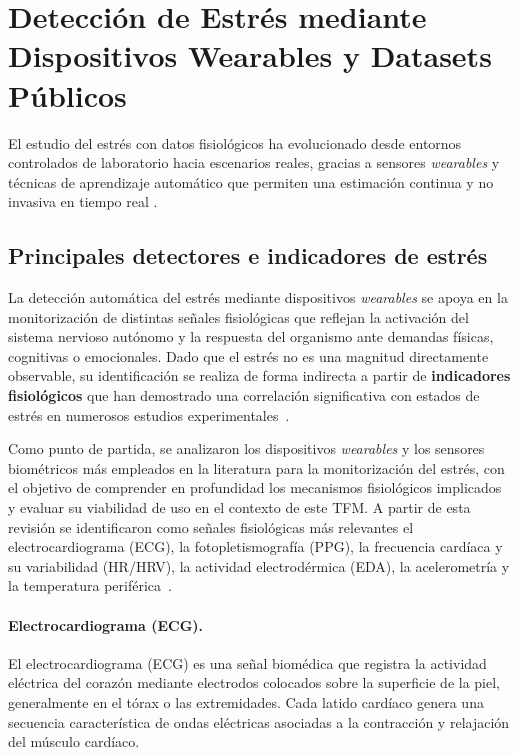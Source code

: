\documentclass{report}
\begin{document}
\section{Detección de Estrés mediante Dispositivos Wearables y Datasets Públicos}
\label{sec:datasets-stress}

El estudio del estrés con datos fisiológicos ha evolucionado desde entornos controlados de laboratorio hacia escenarios reales, gracias a sensores \textit{wearables} y técnicas de aprendizaje automático que permiten una estimación continua y no invasiva en tiempo real \cite{Pinge2024StressWearables,Chacon2025StressRecognition,Rehman2025IoTHealth}.

\subsection{Principales detectores e indicadores de estrés}

La detección automática del estrés mediante dispositivos \textit{wearables} se apoya en la monitorización de distintas señales fisiológicas que reflejan la activación del sistema nervioso autónomo y la respuesta del organismo ante demandas físicas, cognitivas o emocionales. Dado que el estrés no es una magnitud directamente observable, su identificación se realiza de forma indirecta a partir de \textbf{indicadores fisiológicos} que han demostrado una correlación significativa con estados de estrés en numerosos estudios experimentales~\cite{Giakoumis2012,Kim2018}.

Como punto de partida, se analizaron los dispositivos \textit{wearables} y los sensores biométricos más empleados en la literatura para la monitorización del estrés, con el objetivo de comprender en profundidad los mecanismos fisiológicos implicados y evaluar su viabilidad de uso en el contexto de este TFM. A partir de esta revisión se identificaron como señales fisiológicas más relevantes el electrocardiograma (ECG), la fotopletismografía (PPG), la frecuencia cardíaca y su variabilidad (HR/HRV), la actividad electrodérmica (EDA), la acelerometría y la temperatura periférica~\cite{Giakoumis2012,abd2024wearable}.

\paragraph{Electrocardiograma (ECG).}
El electrocardiograma (ECG) es una señal biomédica que registra la actividad eléctrica del corazón mediante electrodos colocados sobre la superficie de la piel, generalmente en el tórax o las extremidades. Cada latido cardíaco genera una secuencia característica de ondas eléctricas asociadas a la contracción y relajación del músculo cardíaco.
\end{document}
